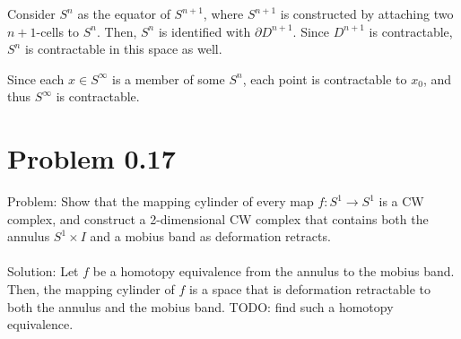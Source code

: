 \documentclass[paper=a4, fontsize=11pt]{scrartcl} %
\numberwithin{equation}{section} %
\numberwithin{figure}{section} %
\numberwithin{table}{section} %
\begin{document}
Consider $S^n$ as the equator of $S^{n+1}$, where $S^{n+1}$ is constructed by attaching two $n+1$-cells
to $S^n$. Then, $S^n$ is identified with $\partial D^{n+1}$. Since $D^{n+1}$ is contractable, $S^n$ is contractable
in this space as well.

Since each $x\in S^{\infty}$ is a member of some $S^n$, each point is contractable to $x_0$, and thus
$S^{\infty}$ is contractable.


\section*{Problem 0.17}
Problem: Show that the mapping cylinder of every map $f:S^1\to S^1$ is a CW complex, and
construct a 2-dimensional CW complex that contains both the annulus $S^1\times I$ and a
mobius band as deformation retracts.
\\
\\
Solution: Let $f$ be a homotopy equivalence from the annulus to the mobius band.
Then, the mapping cylinder of $f$ is a space that is deformation retractable to both the
annulus and the mobius band. TODO: find such a homotopy equivalence.
\end{document}
